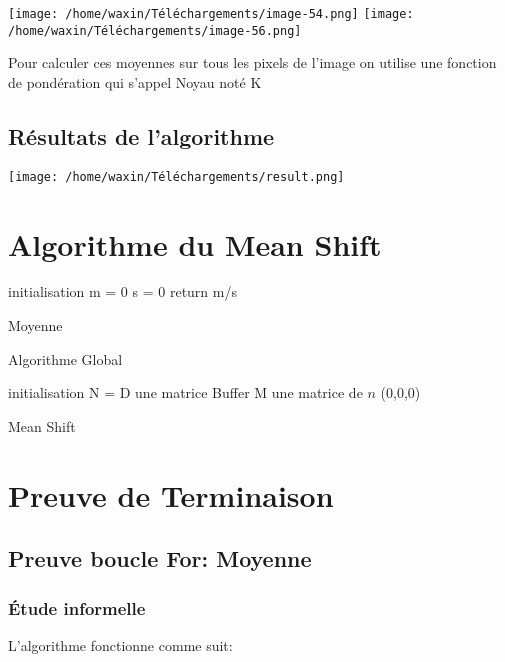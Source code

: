 \documentclass[12pt,a4paper]{article}
\begin{document}
\texttt{[image: /home/waxin/Téléchargements/image-54.png]}
\texttt{[image: /home/waxin/Téléchargements/image-56.png]} 

Pour calculer ces moyennes sur tous les pixels de l'image on utilise une fonction de pondération
qui s'appel Noyau noté K
\subsection*{Résultats de l'algorithme}
\texttt{[image: /home/waxin/Téléchargements/result.png]}

\section*{Algorithme du Mean Shift}

\small
\begin{algorithm}[H]
    \SetAlgoLined
    initialisation\;
    m = 0 \;
    s = 0 \;
    return m/s

    \caption{Moyenne}
\end{algorithm}

Algorithme Global

\begin{algorithm}[H]
    \SetAlgoLined
    initialisation\;
    N = D une matrice Buffer\;
    M une matrice de $n$ (0,0,0)\;
    \caption{Mean Shift}
\end{algorithm}
\normalsize

\section*{Preuve de Terminaison}

\subsection*{Preuve boucle For: Moyenne}
\subsubsection*{Étude informelle}
L'algorithme fonctionne comme suit:
\end{document}
